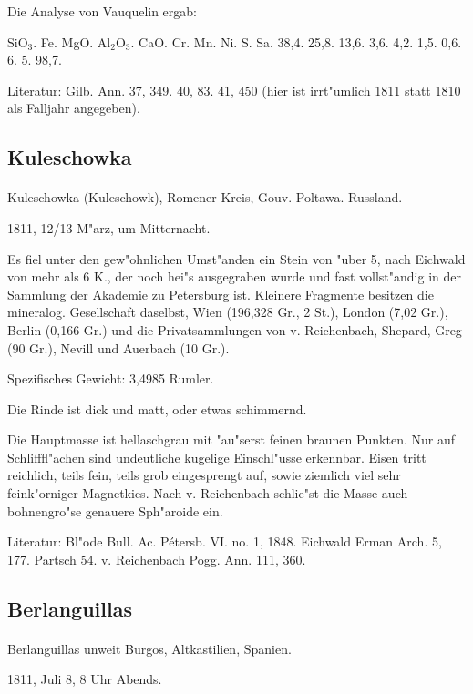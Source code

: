 \documentclass[a4paper, 11pt, oneside]{article}
\begin{document}
Die Analyse von Vauquelin ergab:

SiO$_{3}$. Fe. MgO. Al$_{2}$O$_{3}$. CaO. Cr. Mn. Ni. S. Sa.  
38,4. 25,8. 13,6. 3,6. 4,2. 1,5. 0,6. 6. 5. 98,7.

Literatur: Gilb. Ann. 37, 349. 40, 83. 41, 450 (hier ist irrt"umlich 1811 statt 1810 als Falljahr angegeben).

\subsection{Kuleschowka}
\normalsize
\paragraph{}
Kuleschowka (Kuleschowk), Romener Kreis, Gouv. Poltawa. Russland.

1811, 12/13 M"arz, um Mitternacht.

Es fiel unter den gew"ohnlichen Umst"anden ein Stein von "uber 5, nach Eichwald von mehr als 6 K., der noch hei"s ausgegraben wurde und fast vollst"andig in der Sammlung der Akademie zu Petersburg ist. Kleinere Fragmente besitzen die mineralog. Gesellschaft daselbst, Wien (196,328 Gr., 2 St.), London (7,02 Gr.), Berlin (0,166 Gr.) und die Privatsammlungen von v. Reichenbach, Shepard, Greg (90 Gr.), Nevill und Auerbach (10 Gr.).

Spezifisches Gewicht: 3,4985 Rumler.

Die Rinde ist dick und matt, oder etwas schimmernd.

Die Hauptmasse ist hellaschgrau mit "au"serst feinen braunen Punkten. Nur auf Schlifffl"achen sind undeutliche kugelige Einschl"usse erkennbar. Eisen tritt reichlich, teils fein, teils grob eingesprengt auf, sowie ziemlich viel sehr feink"orniger Magnetkies. Nach v. Reichenbach schlie"st die Masse auch bohnengro"se genauere Sph"aroide ein.

Literatur: Bl"ode Bull. Ac. Pétersb. VI. no. 1, 1848. Eichwald Erman Arch. 5, 177. Partsch 54. v. Reichenbach Pogg. Ann. 111, 360.

\subsection{Berlanguillas}
\normalsize
\paragraph{}
Berlanguillas unweit Burgos, Altkastilien, Spanien.

1811, Juli 8, 8 Uhr Abends.
\end{document}
